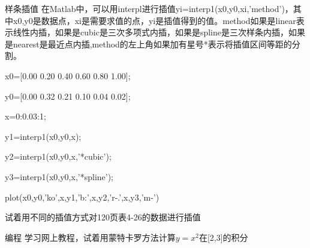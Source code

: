\documentclass[mathserif, table]{beamer}
\begin{document}
\begin{frame}{样条插值}
  在Matlab中，可以用interpl进行插值yi=interp1(x0,y0,xi,'method')，其中x0,y0是数据点，xi是需要求值的点，yi是插值得到的值。method如果是linear表示线性内插，如果是cubic是三次多项式内插，如果是spline是三次样条内插，如果是nearest是最近点内插,method的左上角如果加有星号*表示将插值区间等距的分割。

  \begin{block}{}
    x0=[0.00 0.20 0.40 0.60 0.80 1.00];

    y0=[0.00 0.32 0.21 0.10 0.04 0.02];

    x=0:0.03:1;

    y1=interp1(x0,y0,x);

    y2=interp1(x0,y0,x,'*cubic');

    y3=interp1(x0,y0,x,'*spline');

    plot(x0,y0,'ko',x,y1,'b:',x,y2,'r-.',x,y3,'m-')
  \end{block}

  试着用不同的插值方式对120页表4-26的数据进行插值
  
\end{frame}

\begin{frame}{编程}
  学习网上教程，试着用蒙特卡罗方法计算$y=x^2$在[2,3]的积分
\end{frame}
\end{document}
